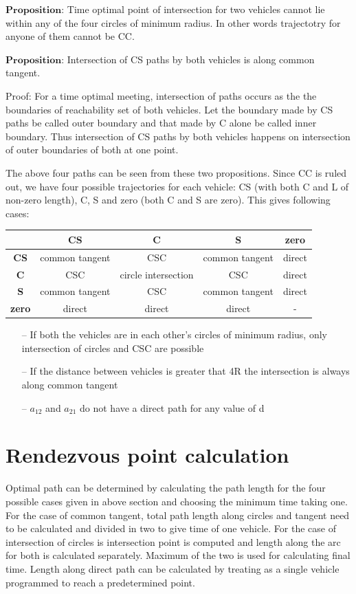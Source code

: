 \documentclass[11pt]{article} %
\begin{document}
$\textbf{Proposition:}$ Time optimal point of intersection for two vehicles cannot lie within any of the four circles of minimum radius. In other words trajectotry for anyone of them cannot be CC.

$\textbf{Proposition:}$ Intersection of CS paths by both vehicles is along common tangent.

Proof: For a time optimal meeting, intersection of paths occurs as the the boundaries of reachability set of both vehicles. Let the boundary made by CS paths be called outer boundary and that made by C alone be called inner boundary. Thus intersection of CS paths by both vehicles happens on intersection of outer boundaries of both at one point. 

The above four paths can be seen from these two propositions. Since CC is ruled out, we have four possible trajectories for each vehicle: CS (with both C and L of non-zero length), C, S and zero (both C and S are zero). This gives following cases:

\begin{table}[H]
\centering
\begin{tabular}{|c|c|c|c|c|}
\hline
\textbf{} & \textbf{CS} & \textbf{C} & \textbf{S} & \textbf{zero} \\ \hline
\textbf{CS} & common tangent & CSC & common tangent & direct \\ \hline
\textbf{C} & CSC & circle intersection & CSC & direct \\ \hline
\textbf{S} & common tangent & CSC & common tangent & direct \\ \hline
\textbf{zero} & direct & direct & direct & - \\ \hline
\end{tabular}
\end{table}

\begin{itemize}
\item[--] If both the vehicles are in each other's circles of minimum radius, only intersection of circles and CSC are possible
\item[--] If the distance between vehicles is greater that 4R the intersection is always along common tangent
\item[--] $a_{12}$ and $a_{21}$ do not have a direct path for any value of d
\end{itemize}

\section{Rendezvous point calculation}
 Optimal path can be determined by calculating the path length for the four possible cases given in above section and choosing the minimum time taking one. For the case of common tangent, total path length along circles and tangent need to be calculated and divided in two to give time of one vehicle.  For the case of intersection of circles is intersection point is computed and length along the arc for both is calculated separately. Maximum of the two is used for calculating final time. Length along direct path can be calculated by treating as a single vehicle programmed to reach a predetermined point. 
 
\end{document}
